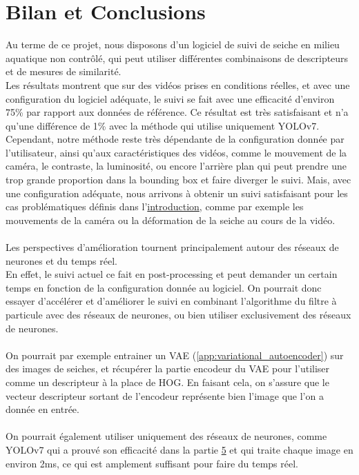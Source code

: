 \chapter{Bilan et Conclusions}
Au terme de ce projet, nous disposons d'un logiciel de suivi de seiche en milieu aquatique non contrôlé, qui peut utiliser différentes combinaisons de descripteurs et de mesures de similarité.\\
Les résultats montrent que sur des vidéos prises en conditions réelles, et avec une configuration du logiciel adéquate, le suivi se fait avec une efficacité d'environ 75\% par rapport aux données de référence. Ce résultat est très satisfaisant et n'a qu'une différence de 1\% avec la méthode qui utilise uniquement YOLOv7.\\
Cependant, notre méthode reste très dépendante de la configuration donnée par l'utilisateur, ainsi qu'aux caractéristiques des vidéos, comme le mouvement de la caméra, le contraste, la luminosité, ou encore l'arrière plan qui peut prendre une trop grande proportion dans la bounding box et faire diverger le suivi. Mais, avec une configuration adéquate, nous arrivons à obtenir un suivi satisfaisant pour les cas problématiques définis dans l'\hyperlink{chapter.1}{introduction}, comme par exemple les mouvements de la caméra ou la déformation de la seiche au cours de la vidéo.\\
\\
Les perspectives d'amélioration tournent principalement autour des réseaux de neurones et du temps réel.\\
En effet, le suivi actuel ce fait en post-processing et peut demander un certain temps en fonction de la configuration donnée au logiciel. On pourrait donc essayer d'accélérer et d'améliorer le suivi en combinant l'algorithme du filtre à particule avec des réseaux de neurones, ou bien utiliser exclusivement des réseaux de neurones.\\
\\
On pourrait par exemple entrainer un VAE (\ref{app:variational_autoencoder}) sur des images de seiches, et récupérer la partie encodeur du VAE pour l'utiliser comme un descripteur à la place de HOG. En faisant cela, on s'assure que le vecteur descripteur sortant de l'encodeur représente bien l'image que l'on a donnée en entrée.\\
\\
On pourrait également utiliser uniquement des réseaux de neurones, comme YOLOv7 qui a prouvé son efficacité dans la partie \hyperlink{chapter.5}{5} et qui traite chaque image en environ 2ms, ce qui est amplement suffisant pour faire du temps réel.

\clearpage
